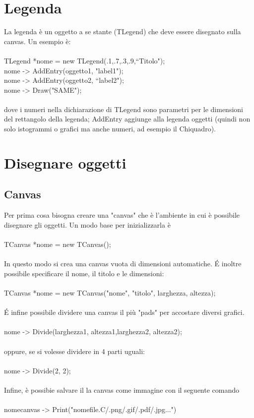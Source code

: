 \documentclass[10pt,a4paper]{article}
\begin{document}
\section{Legenda}
La legenda è un oggetto a se stante (TLegend) che deve essere disegnato sulla canvas. Un esempio è:\\\\
TLegend *nome = new TLegend(.1,.7,.3,.9,“Titolo");\\
nome -> AddEntry(oggetto1, "label1");\\
nome -> AddEntry(oggetto2, “label2");\\
nome -> Draw("SAME");\\\\
dove i numeri nella dichiarazione di TLegend sono parametri per le dimensioni del rettangolo della legenda; AddEntry aggiunge alla legenda oggetti (quindi non solo istogrammi o grafici ma anche numeri, ad esempio il Chiquadro). 
\section{Disegnare oggetti}
\subsection{Canvas}
Per prima cosa bisogna creare una "canvas" che è l'ambiente in cui è possibile disegnare gli oggetti. Un modo base per inizializzarla è\\\\
TCanvas *nome = new TCanvas();\\\\
In questo modo si crea una canvas vuota di dimensioni automatiche. \'{E} inoltre possibile specificare il nome, il titolo e le dimensioni:\\\\
TCanvas *nome = new TCanvas("nome", "titolo", larghezza, altezza);\\\\
\'{E} infine possibile dividere una canvas il più "pads" per accostare diversi grafici.\\\\
nome -> Divide(larghezza1, altezza1,larghezza2, altezza2);\\\\
oppure, se si volesse dividere in 4 parti uguali:\\\\
nome -> Divide(2, 2);\\\\
Infine, è possibie salvare il la canvas come immagine con il seguente comando\\\\
nomecanvas -> Print("nomefile.C/.png/.gif/.pdf/.jpg...")
\end{document}
